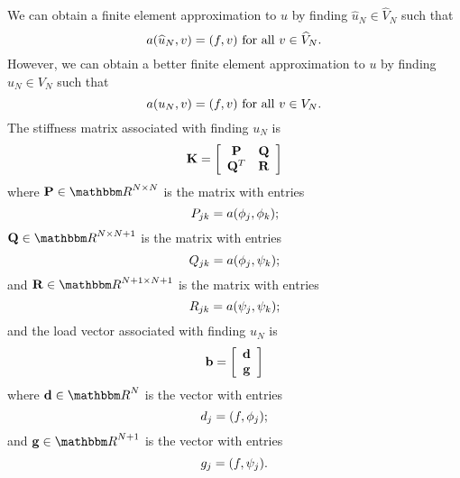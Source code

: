 We can obtain a finite element approximation to $u$ by finding $\widehat{u}_N\in\widehat{V}_N$ such that
\[
a(\widehat{u}_N,v)=(f,v)\mbox{ for all }v\in\widehat{V}_N.
\]
However, we can obtain a better finite element approximation to $u$ by finding $u_N\in V_N$ such that
\[
a(u_N,v)=(f,v)\mbox{ for all }v\in V_N.
\]
The stiffness matrix associated with finding $u_N$ is
\[
{\bf K}=\left[\begin{array}{cc}{\bf P} & {\bf Q} \\ {\bf Q}^T & {\bf R}\end{array}\right]
\]
where $\BP\in\R^{N\times N}$ is the matrix with entries
\[
P_{jk}=a(\phi_j,\phi_k);
\]
$\BQ\in\R^{N\times N+1}$ is the matrix with entries
\[
Q_{jk}=a(\phi_j,\psi_k);
\]
and $\BR\in\R^{N+1\times N+1}$ is the matrix with entries
\[
R_{jk}=a(\psi_j,\psi_k);
\]
and the load vector associated with finding $u_N$ is
\[
{\bf b}=\left[\begin{array}{c}{\bf d} \\ {\bf g}\end{array}\right]
\]
where $\Bd\in\R^N$ is the vector with entries
\[
d_j=(f,\phi_j);
\]
and $\Bg\in\R^{N+1}$ is the vector with entries
\[
g_j=(f,\psi_j).
\]

